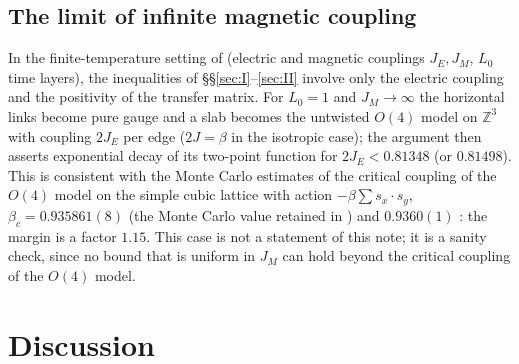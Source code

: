 \documentclass[11pt,a4paper]{article}
\theoremstyle{plain}
\theoremstyle{remark}
\numberwithin{equation}{section}
\newcommand{\Z}{\mathbb{Z}}
\begin{document}
\subsection{The limit of infinite magnetic coupling}\label{sec:O4}
In the finite-temperature setting of \cite{BS83} (electric and magnetic couplings $J_E,J_M$, $L_0$ time layers), the inequalities of
\S\S\ref{sec:I}--\ref{sec:II} involve only the electric coupling and the positivity of the transfer matrix. For $L_0=1$ and
$J_M\to\infty$ the horizontal links become pure gauge and a slab becomes the untwisted $O(4)$ model on $\Z^3$ with coupling
$2J_E$ per edge ($2J=\beta$ in the isotropic case); the argument then asserts exponential decay of its two-point function for
$2J_E<0.81348$ (or $0.81498$). This is consistent with the Monte Carlo estimates of the critical coupling of the $O(4)$ model on the
simple cubic lattice with action $-\beta\sum s_x\cdot s_y$, $\beta_c=0.935861(8)$ (the Monte Carlo value retained in
\cite[Tables~3--4]{CH98}) and $0.9360(1)$ \cite{KK95}: the margin is a factor $1.15$. This case is not a statement of this note; it is a sanity check,
since no bound that is uniform in $J_M$ can hold beyond the critical coupling of the $O(4)$ model.

\section{Discussion}\label{sec:discussion}
\end{document}
